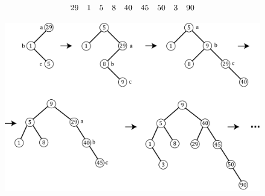 \documentclass[discrete.tex]{subfiles}
\begin{document}
\begin{Example}
  \[29 \quad 1 \quad 5 \quad 8 \quad 40 \quad 45 \quad 50 \quad 3 \quad 90\]
  \begin{figure}[H]
          \includegraphics[width=13cm]{pics/33_5}
          \centering
  \end{figure}
\end{Example}
\end{document}
